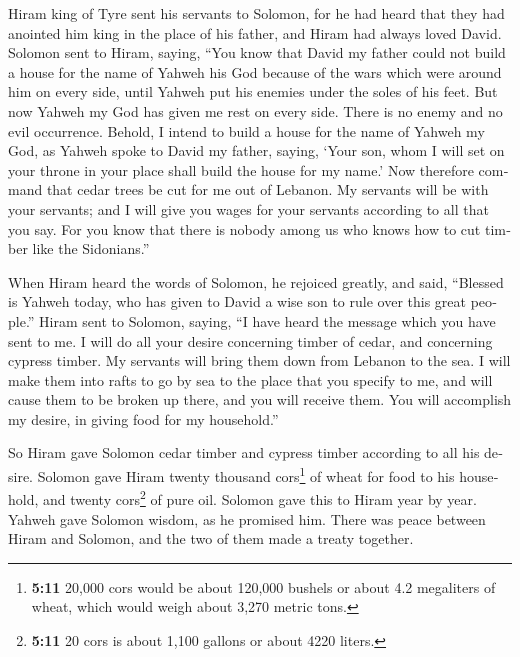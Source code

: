 \begin{paracol}{2}
\begin{otherlanguage}{english}
 Hiram king of Tyre sent his servants to Solomon, for he
had heard that they had anointed him king in the place of his father,
and Hiram had always loved David.  Solomon sent to Hiram,
saying,  ``You know that David my father could not build a
house for the name of Yahweh his God because of the wars which were
around him on every side, until Yahweh put his enemies under the soles
of his feet.  But now Yahweh my God has given me rest on
every side. There is no enemy and no evil occurrence. 
Behold, I intend to build a house for the name of Yahweh my God, as
Yahweh spoke to David my father, saying, `Your son, whom I will set on
your throne in your place shall build the house for my name.'
 Now therefore command that cedar trees be cut for me out
of Lebanon. My servants will be with your servants; and I will give you
wages for your servants according to all that you say. For you know that
there is nobody among us who knows how to cut timber like the
Sidonians.''

 When Hiram heard the words of Solomon, he rejoiced
greatly, and said, ``Blessed is Yahweh today, who has given to David a
wise son to rule over this great people.''  Hiram sent to
Solomon, saying, ``I have heard the message which you have sent to me. I
will do all your desire concerning timber of cedar, and concerning
cypress timber.  My servants will bring them down from
Lebanon to the sea. I will make them into rafts to go by sea to the
place that you specify to me, and will cause them to be broken up there,
and you will receive them. You will accomplish my desire, in giving food
for my household.''

 So Hiram gave Solomon cedar timber and cypress timber
according to all his desire.  Solomon gave Hiram twenty
thousand cors\footnote{\textbf{5:11} 20,000 cors would be about 120,000
  bushels or about 4.2 megaliters of wheat, which would weigh about
  3,270 metric tons.} of wheat for food to his household, and twenty
cors\footnote{\textbf{5:11} 20 cors is about 1,100 gallons or about 4220
  liters.} of pure oil. Solomon gave this to Hiram year by year.
 Yahweh gave Solomon wisdom, as he promised him. There
was peace between Hiram and Solomon, and the two of them made a treaty
together.


\end{otherlanguage}
\end{paracol}
